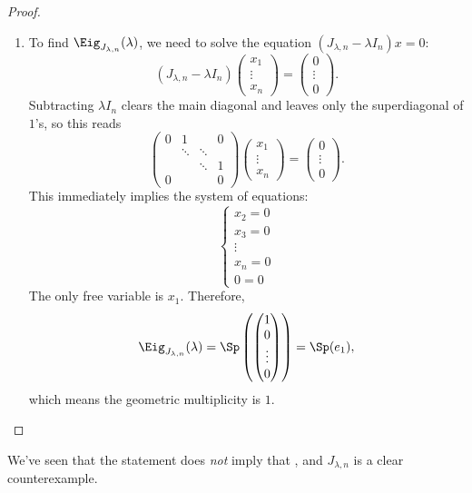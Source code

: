 \begin{proof}
\begin{enumerate}[label=\textbf{(\alph*)}]
    \item To find $\Eig_{J_{\lambda, n}}(\lambda)$, we need to solve the equation $(J_{\lambda, n} - \lambda I_n)x = 0$:
    \[
    (J_{\lambda, n} - \lambda I_n) \begin{pmatrix} x_1 \\ \vdots \\ x_n \end{pmatrix} = \begin{pmatrix} 0 \\ \vdots \\ 0 \end{pmatrix}.
    \]
    Subtracting $\lambda I_n$ clears the main diagonal and leaves only the superdiagonal of $1$'s, so this reads
    \[
    \begin{pmatrix} 0 & 1 & & 0 \\ & \ddots & \ddots & \\ & & \ddots & 1 \\ 0 & & & 0 \end{pmatrix} \begin{pmatrix} x_1 \\ \vdots \\ x_n \end{pmatrix} = \begin{pmatrix} 0 \\ \vdots \\ 0 \end{pmatrix}.
    \]
    This immediately implies the system of equations:
    \[
    \begin{cases}
    x_2 = 0 \\
    x_3 = 0 \\
    \vdots \\
    x_n = 0 \\
    0 = 0
    \end{cases}
    \]
    The only free variable is $x_1$. Therefore,
    \[
    \Eig_{J_{\lambda, n}}(\lambda) = \Sp\left( \begin{pmatrix} 1 \\ 0 \\ \vdots \\ 0 \end{pmatrix} \right) = \Sp(e_1),
    \]
    which means the geometric multiplicity is $1$.
\end{enumerate}
\end{proof}

We've seen that the statement  does \emph{not} imply that , and $J_{\lambda, n}$ is a clear counterexample.

